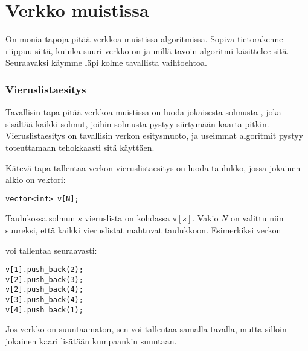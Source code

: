 \section{Verkko muistissa}

On monia tapoja pitää verkkoa muistissa algoritmissa.
Sopiva tietorakenne riippuu siitä,
kuinka suuri verkko on ja
millä tavoin algoritmi käsittelee sitä.
Seuraavaksi käymme läpi kolme tavallista vaihtoehtoa.

\subsubsection{Vieruslistaesitys}


Tavallisin tapa pitää verkkoa muistissa on
luoda jokaisesta solmusta ,
joka sisältää kaikki solmut,
joihin solmusta pystyy siirtymään kaarta pitkin.
Vieruslistaesitys on tavallisin verkon esitysmuoto, ja
useimmat algoritmit pystyy toteuttamaan
tehokkaasti sitä käyttäen.

Kätevä tapa tallentaa verkon vieruslistaesitys on luoda taulukko,
jossa jokainen alkio on vektori:
\begin{lstlisting}
vector<int> v[N];
\end{lstlisting}

Taulukossa solmun $s$ vieruslista on kohdassa $\texttt{v}[s]$.
Vakio $N$ on valittu niin suureksi,
että kaikki vieruslistat mahtuvat taulukkoon.
Esimerkiksi verkon

\begin{center}
\end{center}
voi tallentaa seuraavasti:
\begin{lstlisting}
v[1].push_back(2);
v[2].push_back(3);
v[2].push_back(4);
v[3].push_back(4);
v[4].push_back(1);
\end{lstlisting}

Jos verkko on suuntaamaton, sen voi tallentaa samalla tavalla,
mutta silloin jokainen kaari lisätään kumpaankin suuntaan.

